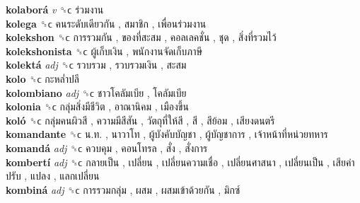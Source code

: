 \textbf{kolaborá} \emph{v}  ␝ϲ   ร่วมงาน   \\
\textbf{kolega} ␝ϲ   คนระดับเดียวกัน ,  สมาชิก ,  เพื่อนร่วมงาน   \\
\textbf{kolekshon} ␝ϲ   การรวมกัน ,  ของที่สะสม ,  คอลเลคชั่น ,  ชุด ,  สิ่งที่รวมไว้   \\
\textbf{kolekshonista} ␝ϲ   ผู้เก็บเงิน ,  พนักงานจัดเก็บภาษี   \\
\textbf{kolektá} \emph{adj}  ␝ϲ   รวบรวม ,  รวบรวมเงิน ,  สะสม   \\
\textbf{kolo} ␝ϲ   กะหล่ำปลี   \\
\textbf{kolombiano} \emph{adj}  ␝ϲ   ชาวโคลัมเบีย ,  โคลัมเบีย   \\
\textbf{kolonia} ␝ϲ   กลุ่มสิ่งมีชีวิต ,  อาณานิคม ,  เมืองขึ้น   \\
\textbf{koló} ␝ϲ   กลุ่มคนผิวสี ,  ความมีสีสัน ,  วัตถุที่ให้สี ,  สี ,  สีย้อม ,  เสียงดนตรี   \\
\textbf{komandante} ␝ϲ   น.ท. ,  นาวาโท ,  ผู้บังคับบัญชา ,  ผู้บัญชาการ ,  เจ้าหน้าที่หน่วยทหาร   \\
\textbf{komandá} \emph{adj}  ␝ϲ   ควบคุม ,  คอนโทรล ,  สั่ง ,  สั่งการ   \\
\textbf{kombertí} \emph{adj}  ␝ϲ   กลายเป็น ,  เปลี่ยน ,  เปลี่ยนความเชื่อ ,  เปลี่ยนศาสนา ,  เปลี่ยนเป็น ,  เสียค่าปรับ ,  แปลง ,  แลกเปลี่ยน   \\
\textbf{kombiná} \emph{adj}  ␝ϲ   การรวมกลุ่ม ,  ผสม ,  ผสมเข้าด้วยกัน ,  มิกซ์   \\
